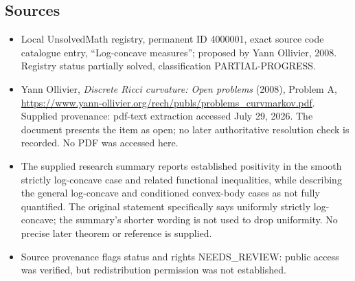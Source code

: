 \documentclass[11pt]{article}
\begin{document}
\subsection{Sources}
\begin{itemize}
\item Local UnsolvedMath registry, permanent ID 4000001, exact source code catalogue entry, ``Log-concave measures''; proposed by Yann Ollivier, 2008. Registry status partially solved, classification PARTIAL-PROGRESS.
\item Yann Ollivier, \emph{Discrete Ricci curvature: Open problems} (2008), Problem A, \url{https://www.yann-ollivier.org/rech/publs/problems_curvmarkov.pdf}. Supplied provenance: pdf-text extraction accessed July 29, 2026. The document presents the item as open; no later authoritative resolution check is recorded. No PDF was accessed here.
\item The supplied research summary reports established positivity in the smooth strictly log-concave case and related functional inequalities, while describing the general log-concave and conditioned convex-body cases as not fully quantified. The original statement specifically says uniformly strictly log-concave; the summary's shorter wording is not used to drop uniformity. No precise later theorem or reference is supplied.
\item Source provenance flags status and rights NEEDS\_REVIEW: public access was verified, but redistribution permission was not established.
\end{itemize}
\end{document}
